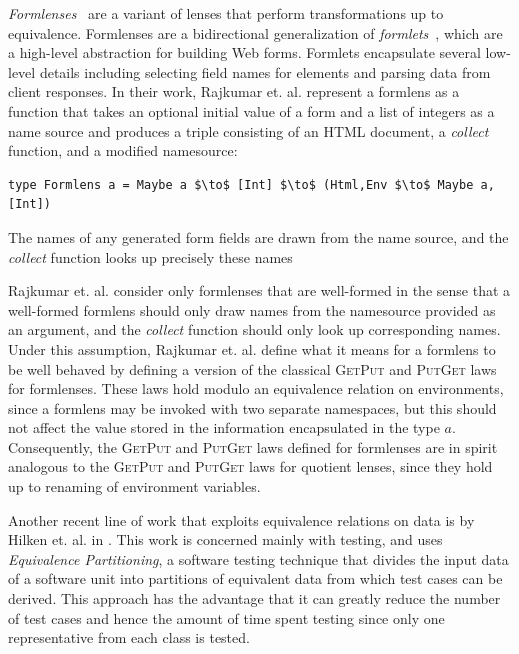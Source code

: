 \documentclass[acmsmall,screen]{acmart}
\newcommand{\kw}[1]{\textcolor{dkblue}{\ensuremath{\mathsf{#1}}}}
\begin{document}
{\em Formlenses}~\cite{rajkumar2014lenses} are a variant of lenses that
perform transformations up to equivalence. Formlenses are a bidirectional
generalization of {\em formlets}~\cite{cooper2008essence}, which are a
high-level abstraction for building Web forms. Formlets encapsulate several
low-level details including selecting field names for elements and parsing data
from client responses. In their work, Rajkumar et. al. represent a formlens as a
function that takes an optional initial value of a form and a list of integers as a name source and produces a triple consisting of an
HTML document, a {\em collect} function, and a modified namesource:
\begin{center}
\begin{lstlisting}
type Formlens a = Maybe a $\to$ [Int] $\to$ (Html,Env $\to$ Maybe a,[Int])
\end{lstlisting}
\end{center}
The names of any generated form fields are drawn from the name source, and the
{\em collect} function looks up precisely these names

Rajkumar et. al. consider only formlenses that are well-formed in the sense that a
well-formed formlens should only draw names from the namesource provided as an
argument, and the {\em collect} function should only look up corresponding
names. Under this assumption, Rajkumar et. al. define what it means for a
formlens to be well behaved by defining a version of the classical
\textsc{GetPut} and \textsc{PutGet} laws for formlenses. These laws hold modulo
an equivalence relation on environments, since a formlens may be invoked with
two separate namespaces, but this should not affect the value stored in the
information encapsulated in the type $a$. Consequently, the \textsc{GetPut} and
\textsc{PutGet} laws defined for formlenses are in spirit analogous to the
\textsc{GetPut} and \textsc{PutGet} laws for quotient lenses, since they hold
up to renaming of environment variables.

Another recent line of work that exploits equivalence relations on data is by
Hilken et. al. in \cite{hilken2016testing}. This work is concerned mainly with
testing, and uses {\em Equivalence Partitioning}, a software testing technique
that divides the input data of a software unit into partitions of equivalent
data from which test cases can be derived. This approach has the advantage that
it can greatly reduce the number of test cases and hence the amount of time
spent testing since only one representative from each class is tested.
\end{document}
